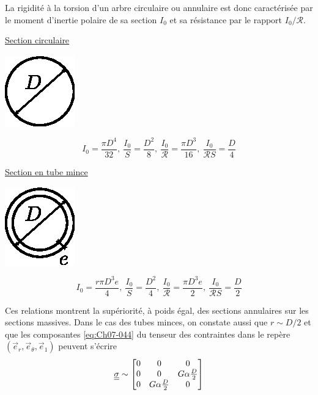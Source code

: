 La rigidité à la torsion d'un arbre circulaire ou annulaire est donc caractérisée par le moment d'inertie polaire de sa section $I_0$ et sa résistance par le rapport $I_0/\mathcal{R}$.

\underline{Section circulaire}
\begin{multicols}{2}
    \begin{center}
        \includegraphics{../images/T1_Ch07-12}
    \end{center}
    \columnbreak
    \begin{displaymath}
        I_0 = \frac{\pi D^4}{32},\ \frac{I_0}{S} = \frac{D^2}{8},\ \frac{I_0}{\mathcal{R}} = \frac{\pi D^3}{16},\ \frac{I_0}{\mathcal{R} S} = \frac{D}{4}
    \end{displaymath}
\end{multicols}
\underline{Section en tube mince}
\begin{multicols}{2}
    \begin{center}
        \includegraphics{../images/T1_Ch07-13}
    \end{center}
    \columnbreak
    \begin{displaymath}
        I_0 = \frac{r\pi D^3 e}{4},\ \frac{I_0}{S} = \frac{D^2}{4},\ \frac{I_0}{\mathcal{R}} = \frac{\pi D^3 e}{2},\ \frac{I_0}{\mathcal{R} S} = \frac{D}{2}
    \end{displaymath}
\end{multicols}
Ces relations montrent la supériorité, à poids égal, des sections annulaires sur les sections massives.
Dans le cas des tubes minces, on constate aussi que $r \sim D/2$ et que les composantes \eqref{eq:Ch07-044} du tenseur des contraintes dans le repère $\left( \vec{e}_r, \vec{e}_{\theta}, \vec{e}_1 \right)$ peuvent s'écrire
\begin{displaymath}
    \underline{\underline{\sigma}} \sim
    \begin{bmatrix}
        0 & 0 & 0 \\
        0 & 0 & G \alpha \frac{D}{2} \\
        0 & G\alpha \frac{D}{2} & 0
    \end{bmatrix}
\end{displaymath}
